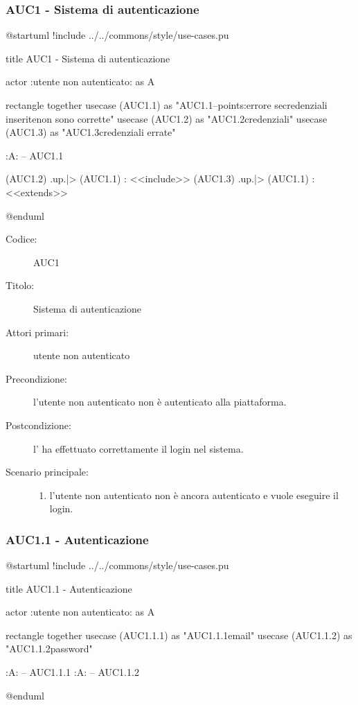 \documentclass[casi-duso]{subfiles}
\begin{document}
\subsubsection{AUC1 - Sistema di autenticazione}%
\label{subsub:AUC1}

\begin{plantuml}
@startuml
!include ../../commons/style/use-cases.pu

title AUC1 - Sistema di autenticazione

actor :utente non autenticato: as A

rectangle {
  together {
    usecase (AUC1.1) as "AUC1.1\nAutenticazione\n--\nExtension points:\nVisualizzazione errore se\nle credenziali inserite\n non sono corrette"
    usecase (AUC1.2) as "AUC1.2\nVerifica credenziali"
    usecase (AUC1.3) as "AUC1.3\nVisualizzazione credenziali errate"
  }
}

:A: -- AUC1.1

(AUC1.2) .up.|> (AUC1.1) : <<include>>
(AUC1.3) .up.|> (AUC1.1) : <<extends>>

@enduml
\end{plantuml}

\begin{description}
  \item[Codice:] AUC1
  \item[Titolo:] Sistema di autenticazione
  \item[Attori primari:] utente non autenticato
  \item[Precondizione:] l'utente non autenticato non è autenticato alla piattaforma.
  \item[Postcondizione:] l' ha effettuato correttamente il login nel sistema.
  \item[Scenario principale:]
  \begin{enumerate}
    \item l'utente non autenticato non è ancora autenticato e vuole eseguire il login.
  \end{enumerate}
\end{description}

\subsubsection{AUC1.1 - Autenticazione}%
\label{subsub:AUC1.1}

\begin{plantuml}
@startuml
!include ../../commons/style/use-cases.pu

title AUC1.1 - Autenticazione

actor :utente non autenticato: as A

rectangle {
  together {
  usecase (AUC1.1.1) as "AUC1.1.1\nInserimento email"
  usecase (AUC1.1.2) as "AUC1.1.2\nInserimento password"
  }
}

:A: -- AUC1.1.1
:A: -- AUC1.1.2

@enduml
\end{plantuml}
\end{document}
